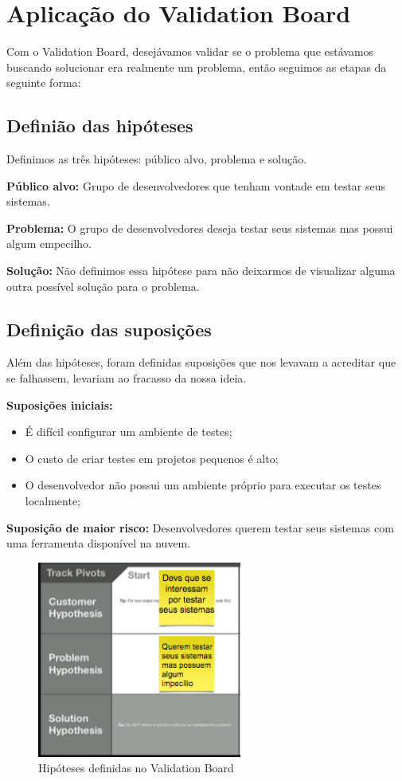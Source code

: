\section{Aplicação do Validation Board}\label{sec:LABEL_CHP_2_SEC_B}

Com o Validation Board, desejávamos validar se o problema que estávamos buscando solucionar era realmente um problema, então seguimos as etapas da seguinte forma:

\subsection{Definião das hipóteses}
Definimos as três hipóteses: público alvo, problema e solução.

\textbf {Público alvo:} Grupo de desenvolvedores que tenham vontade em testar seus sistemas.

\textbf {Problema:} O grupo de desenvolvedores deseja testar seus sistemas mas possui algum empecilho.

\textbf{Solução:} Não definimos essa hipótese para não deixarmos de visualizar alguma outra possível solução para o problema.

\subsection{Definição das suposições}

Além das hipóteses, foram definidas suposições que nos levavam a acreditar que se falhassem, levariam ao fracasso da nossa ideia.

\textbf{Suposições iniciais:}
\begin{itemize}
\item É difícil configurar um ambiente de testes;
\item O custo de criar testes em projetos pequenos é alto;
\item O desenvolvedor não possui um ambiente próprio para executar os testes localmente;
\end{itemize}

\textbf{Suposição de maior risco:}
Desenvolvedores querem testar seus sistemas com uma ferramenta disponível na nuvem.

\begin{figure}
  \centering
  \includegraphics[width=0.6\textwidth]{imagens/hyphotesis.png}
  \caption{Hipóteses definidas no Validation Board}
  \label{fig:LABEL_FIG_2}
\end{figure}

